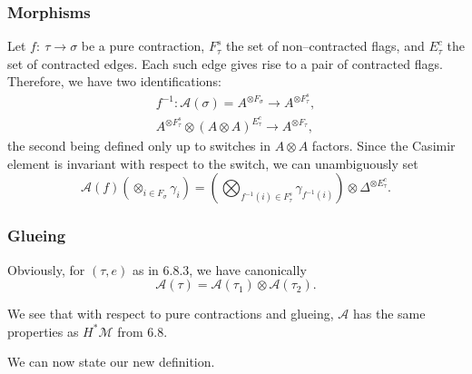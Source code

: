\documentclass[reqno]{amsart}
\theoremstyle{definition}
\begin{document}
\subsubsection{Morphisms}
Let $f:\ \tau\to\sigma$ be a pure
contraction, $F_{\tau}^s$ the set of non--contracted flags,
and $E_{\tau}^c$ the set of contracted edges. Each such edge
gives rise to a pair of contracted flags. Therefore, we have
two identifications:
\begin{gather*}
  f^{-1}\colon \mathcal{A}(\sigma )=A^{\otimes F_{\sigma}}\to
  A^{\otimes F_{\tau}^s},
  \\
  A^{\otimes F^s_{\tau}}\otimes (A\otimes A)^{E^c_{\tau}}\to
  A^{\otimes F_{\tau}},
\end{gather*}
the second being defined only up to switches in $A\otimes A$ factors.
Since the Casimir element is invariant with respect
to the switch, we can unambiguously set
\begin{equation*}
  \mathcal{A}(f)(\otimes_{i\in F_{\sigma}}\gamma_i)=
  \left( \bigotimes_{f^{-1}(i)\in F^s_{\tau}} \gamma_{f^{-1}(i)}\right)
  \otimes \Delta^{\otimes E^c_{\tau}}.
  \tag{6.6}
\end{equation*}

\medskip

\subsubsection{Glueing}
Obviously, for $(\tau ,e)$ as in 6.8.3,
we have canonically
\begin{equation*}
  \mathcal{A}(\tau )
  =\mathcal{A}(\tau_1)\otimes \mathcal{A}(\tau_2).
  \tag{6.7}
\end{equation*}

We see that with respect to pure contractions and glueing,
$\mathcal{A}$ has the same properties as $H^*\mathcal{M}$ from 6.8.

\smallskip

We can now state our new definition.

\medskip

\end{document}
